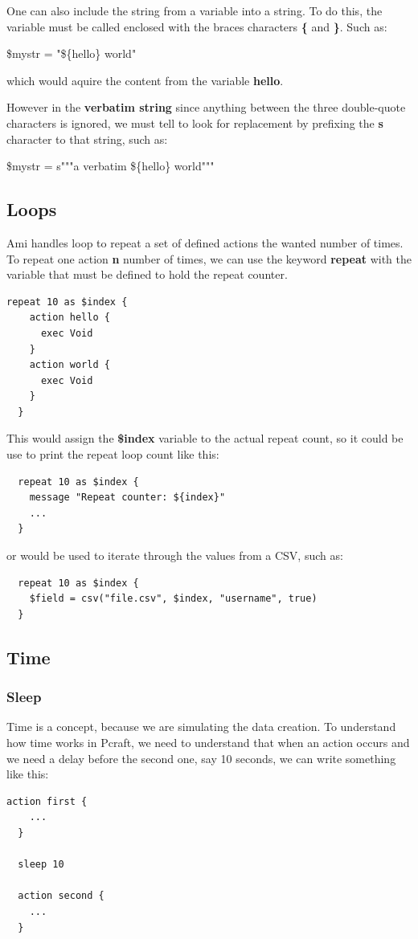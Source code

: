 \documentclass[10pt]{article}
\begin{document}
One can also include the string from a variable into a string. To do this, the variable must be called enclosed with the braces characters \textbf{\{} and \textbf{\}}. Such as:
\begin{center}
  \$mystr = "\$\{hello\} world"
\end{center}
which would aquire the content from the variable \textbf{hello}.

However in the \textbf{verbatim string} since anything between the three double-quote characters is ignored, we must tell to look for replacement by prefixing the \textbf{s} character to that string, such as:
\begin{center}
  \$mystr = s"""a verbatim \$\{hello\} world"""
\end{center}

\subsection{Loops}

Ami handles loop to repeat a set of defined actions the wanted number of times. To repeat one action \textbf{n} number of times, we can use the keyword \textbf{repeat} with the variable that must be defined to hold the repeat counter.

\begin{lstlisting}[caption={Repeat loop},captionpos=b]
  repeat 10 as $index {
    action hello {      
      exec Void
    }
    action world {      
      exec Void
    }    
  }
\end{lstlisting}

This would assign the \textbf{\$index} variable to the actual repeat count, so it could be use to print the repeat loop count like this:
\begin{lstlisting}
  repeat 10 as $index {
    message "Repeat counter: ${index}"
    ...
  }
\end{lstlisting}

or would be used to iterate through the values from a CSV, such as:

\begin{lstlisting}
  repeat 10 as $index {
    $field = csv("file.csv", $index, "username", true)
  }
\end{lstlisting}

\subsection{Time}

\subsubsection{Sleep}
Time is a concept, because we are simulating the data creation. To understand how time works in Pcraft, we need to understand that when an action occurs and we need a delay before the second one, say 10 seconds, we can write something like this:
\begin{lstlisting}[caption={Time Introduction},captionpos=b]
  action first {
    ...
  }

  sleep 10

  action second {
    ...
  }
\end{lstlisting}
\end{document}
